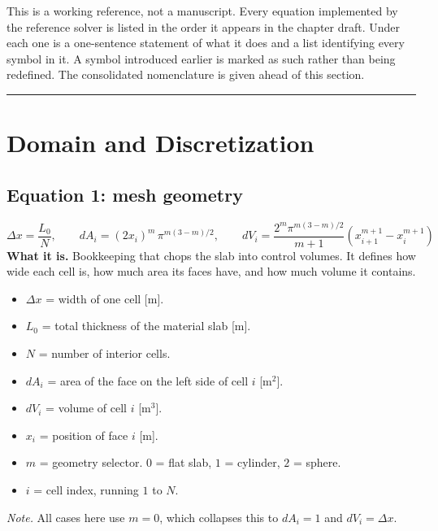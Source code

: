 \documentclass[11pt]{article}
\begin{document}
\clearpage
\noindent
This is a working reference, not a manuscript. Every equation implemented by the
reference solver is listed in the order it appears in the chapter draft. Under
each one is a one-sentence statement of what it does and a list identifying every
symbol in it. A symbol introduced earlier is marked as such rather than being
redefined. The consolidated nomenclature is given ahead of this section.

\vspace{1em}
\hrule
\vspace{1em}

\section{Domain and Discretization}

\subsection*{Equation 1: mesh geometry}
\begin{equation}
\Delta x = \frac{L_0}{N}, \qquad
dA_i = (2x_i)^{m}\,\pi^{m(3-m)/2}, \qquad
dV_i = \frac{2^{m}\pi^{m(3-m)/2}}{m+1}\left(x_{i+1}^{m+1} - x_i^{m+1}\right)
\end{equation}
\textbf{What it is.} Bookkeeping that chops the slab into control volumes. It
defines how wide each cell is, how much area its faces have, and how much volume
it contains.
\begin{itemize}
  \item $\Delta x$ = width of one cell [m].
  \item $L_0$ = total thickness of the material slab [m].
  \item $N$ = number of interior cells.
  \item $dA_i$ = area of the face on the left side of cell $i$ [m$^2$].
  \item $dV_i$ = volume of cell $i$ [m$^3$].
  \item $x_i$ = position of face $i$ [m].
  \item $m$ = geometry selector. $0$ = flat slab, $1$ = cylinder, $2$ = sphere.
  \item $i$ = cell index, running $1$ to $N$.
\end{itemize}
\textit{Note.} All cases here use $m=0$, which collapses this to $dA_i = 1$ and
$dV_i = \Delta x$.
\end{document}
